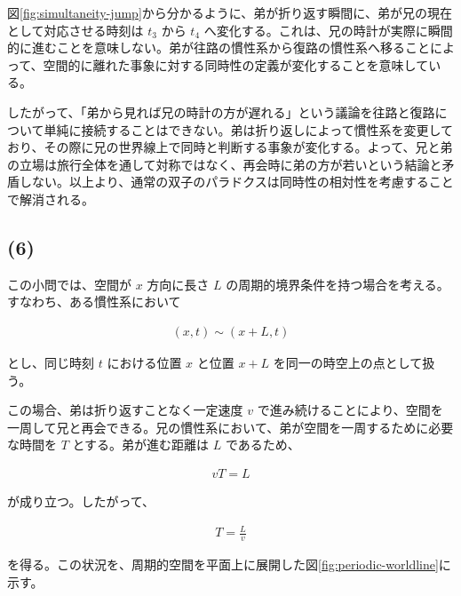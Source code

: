 \documentclass[platex,dvipdfmx,a4paper]{jsarticle}
\begin{document}
図\ref{fig:simultaneity-jump}から分かるように、弟が折り返す瞬間に、弟が兄の現在として対応させる時刻は \(t_3\) から \(t_4\) へ変化する。これは、兄の時計が実際に瞬間的に進むことを意味しない。弟が往路の慣性系から復路の慣性系へ移ることによって、空間的に離れた事象に対する同時性の定義が変化することを意味している。

したがって、「弟から見れば兄の時計の方が遅れる」という議論を往路と復路について単純に接続することはできない。弟は折り返しによって慣性系を変更しており、その際に兄の世界線上で同時と判断する事象が変化する。よって、兄と弟の立場は旅行全体を通して対称ではなく、再会時に弟の方が若いという結論と矛盾しない。以上より、通常の双子のパラドクスは同時性の相対性を考慮することで解消される。

\subsection*{(6)}

この小問では、空間が \(x\) 方向に長さ \(L\) の周期的境界条件を持つ場合を考える。すなわち、ある慣性系において

\begin{align*}
  (x,t)\sim(x+L,t)
\end{align*}

とし、同じ時刻 \(t\) における位置 \(x\) と位置 \(x+L\) を同一の時空上の点として扱う。

この場合、弟は折り返すことなく一定速度 \(v\) で進み続けることにより、空間を一周して兄と再会できる。兄の慣性系において、弟が空間を一周するために必要な時間を \(T\) とする。弟が進む距離は \(L\) であるため、

\begin{align*}
  vT=L
\end{align*}

が成り立つ。したがって、

\begin{align*}
  T=\frac{L}{v}
\end{align*}

を得る。この状況を、周期的空間を平面上に展開した図\ref{fig:periodic-worldline}に示す。
\end{document}

